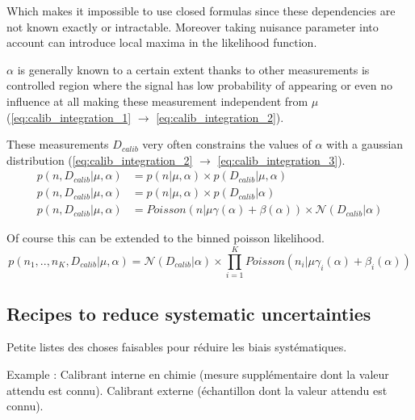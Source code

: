 Which makes it impossible to use closed formulas since these dependencies are not known exactly or intractable.
Moreover taking nuisance parameter into account can introduce local maxima in the likelihood function.


$\alpha$ is generally known to a certain extent thanks to other measurements is controlled region where the signal has low probability of appearing or even no influence at all making these measurement independent from $\mu$ (\autoref{eq:calib_integration_1} $\to$ \autoref{eq:calib_integration_2}).

These measurements $D_{calib}$ very often constrains the values of $\alpha$ with a gaussian distribution (\autoref{eq:calib_integration_2} $\to$ \autoref{eq:calib_integration_3}).
\begin{align}
	\label{eq:calib_integration_1}
	p(n, D_{calib} | \mu, \alpha) &= p(n | \mu, \alpha) \times p(D_{calib} | \mu, \alpha) \\
	\label{eq:calib_integration_2}
	p(n, D_{calib} | \mu, \alpha) &= p(n | \mu, \alpha) \times p(D_{calib} | \alpha) \\
	\label{eq:calib_integration_3}
	p(n, D_{calib} | \mu, \alpha) &= Poisson(n | \mu \gamma(\alpha) +\beta(\alpha)) \times \mathcal N(D_{calib} | \alpha)
\end{align}

Of course this can be extended to the binned poisson likelihood.
\begin{equation}
	p(n_1, .., n_K, D_{calib} | \mu, \alpha) = \mathcal N(D_{calib} | \alpha) \times \prod_{i=1}^K Poisson(n_i | \mu \gamma_i(\alpha) +\beta_i(\alpha))
\end{equation}







\subsection{Recipes to reduce systematic uncertainties} %
\label{sub:recipes_to_reduce_systematic_unceratinties}


Petite listes des choses faisables pour réduire les biais systématiques. 


Example : Calibrant interne en chimie (mesure supplémentaire dont la valeur attendu est connu). Calibrant externe (échantillon dont la valeur attendu est connu).








